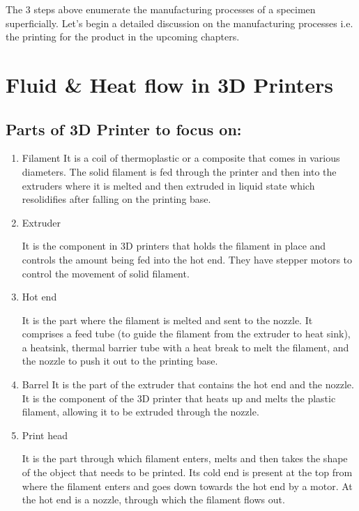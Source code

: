 \documentclass{report}
\begin{document}
The 3 steps above enumerate the manufacturing processes of a specimen superficially. Let's begin a detailed discussion on the manufacturing processes i.e. the printing for the product in the upcoming chapters.

\chapter{Fluid \& Heat flow in 3D Printers}

\section{Parts of 3D Printer to focus on:}
\begin{enumerate}
    \item Filament
    It is a coil of thermoplastic or a composite that comes in various diameters. The solid filament is fed through the printer and then into the extruders where it is melted and then extruded in liquid state which resolidifies after falling on the printing base.
    
    \item Extruder
    
    It is the component in 3D printers that holds the filament in place and controls the amount being fed into the hot end. They have stepper motors to control the movement of solid filament.

    \item Hot end

    It is the part where the filament is melted and sent to the nozzle.
    It comprises a feed tube (to guide the filament from the extruder to heat sink), a heatsink, thermal barrier tube with a heat break to melt the filament, and the nozzle to push it out to the printing base.

    \item Barrel
    It is the part of the extruder that contains the hot end and the nozzle. It is the component of the 3D printer that heats up and melts the plastic filament, allowing it to be extruded through the nozzle.

    \item Print head

    It is the part through which filament enters, melts and then takes the shape of the object that needs to be printed. Its cold end is present at the top from where the filament enters and goes down towards the hot end by a motor. At the hot end is a nozzle, through which the filament flows out. 
    

\end{enumerate}
\end{document}
